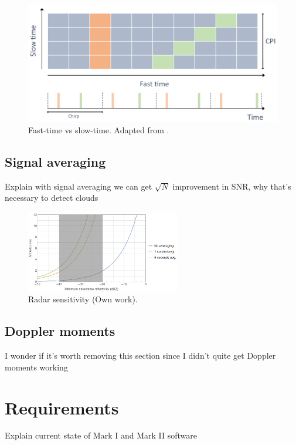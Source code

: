 \documentclass{article}
\begin{document}
\begin{figure}
	\centering
	\includegraphics[width=\textwidth]{slow-fast-time}
	\caption{Fast-time vs slow-time. Adapted from \cite{SlowFastTimeFig}.}
	\label{fig:SlowFastTime}
\end{figure}

\subsection{Signal averaging}
Explain with signal averaging we can get \(\sqrt{N}\) improvement in SNR, why that's necessary to detect clouds

\begin{figure}
	\centering
	\includegraphics[width=0.6\textwidth]{sensitivity}
	\caption{Radar sensitivity  (Own work).}
	\label{fig:SlowFastTime}
\end{figure}

\subsection{Doppler moments}
I wonder if it's worth removing this section since I didn't quite get Doppler moments working

\section{Requirements}
Explain current state of Mark I and Mark II software
\end{document}
